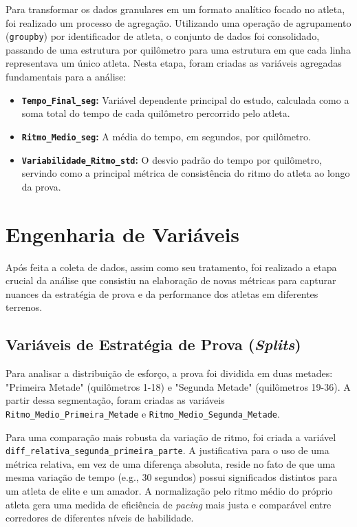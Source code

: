 Para transformar os dados granulares em um formato analítico focado no atleta, foi realizado um processo de agregação. Utilizando uma operação de agrupamento (\texttt{groupby}) por identificador de atleta, o conjunto de dados foi consolidado, passando de uma estrutura por quilômetro para uma estrutura em que cada linha representava um único atleta. Nesta etapa, foram criadas as variáveis agregadas fundamentais para a análise:
\begin{itemize}
    \item \textbf{\texttt{Tempo\_Final\_seg}:} Variável dependente principal do estudo, calculada como a soma total do tempo de cada quilômetro percorrido pelo atleta.
    \item \textbf{\texttt{Ritmo\_Medio\_seg}:} A média do tempo, em segundos, por quilômetro.
    \item \textbf{\texttt{Variabilidade\_Ritmo\_std}:} O desvio padrão do tempo por quilômetro, servindo como a principal métrica de consistência do ritmo do atleta ao longo da prova.
\end{itemize}

\section{Engenharia de Variáveis}
\label{sec:engenharia_variaveis_final}

Após feita a coleta de dados, assim como seu tratamento, foi realizado a etapa crucial da análise que consistiu na elaboração de novas métricas para capturar nuances da estratégia de prova e da performance dos atletas em diferentes terrenos. 

\subsection{Variáveis de Estratégia de Prova (\textit{Splits})}

Para analisar a distribuição de esforço, a prova foi dividida em duas metades: "Primeira Metade" (quilômetros 1-18) e "Segunda Metade" (quilômetros 19-36). A partir dessa segmentação, foram criadas as variáveis \texttt{Ritmo\_Medio\_Primeira\_Metade} e \texttt{Ritmo\_Medio\_Segunda\_Metade}.

Para uma comparação mais robusta da variação de ritmo, foi criada a variável \texttt{diff\_relativa\_segunda\_primeira\_parte}. A justificativa para o uso de uma métrica relativa, em vez de uma diferença absoluta, reside no fato de que uma mesma variação de tempo (e.g., 30 segundos) possui significados distintos para um atleta de elite e um amador. A normalização pelo ritmo médio do próprio atleta gera uma medida de eficiência de \emph{pacing} mais justa e comparável entre corredores de diferentes níveis de habilidade.

